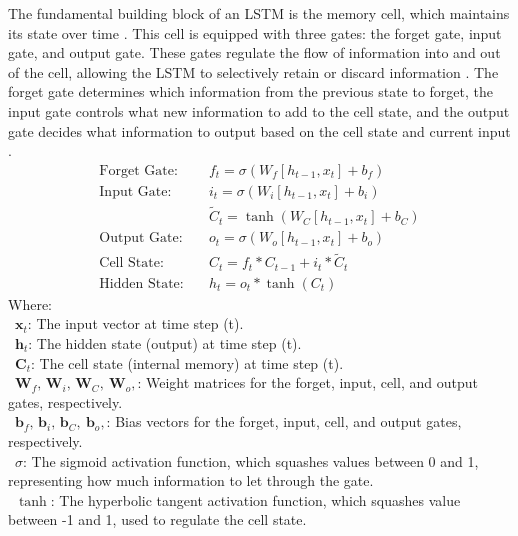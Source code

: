 \documentclass{ieeeojies}
\begin{document}
The fundamental building block of an LSTM is the memory cell, which maintains its state over time \cite{b18}. This cell is equipped with three gates: the forget gate, input gate, and output gate. These gates regulate the flow of information into and out of the cell, allowing the LSTM to selectively retain or discard information \cite{b19}. The forget gate determines which information from the previous state to forget, the input gate controls what new information to add to the cell state, and the output gate decides what information to output based on the cell state and current input \cite{b18}.
\begin{align*}
  \text{Forget Gate:} \quad & f_t = \sigma(W_f [h_{t-1}, x_t] + b_f) \\
  \text{Input Gate:} \quad & i_t = \sigma(W_i [h_{t-1}, x_t] + b_i) \\
  & \tilde{C}_t = \tanh(W_C [h_{t-1}, x_t] + b_C) \\
  \text{Output Gate:} \quad & o_t = \sigma(W_o [h_{t-1}, x_t] + b_o) \\
  \text{Cell State:} \quad & C_t = f_t * C_{t-1} + i_t * \tilde{C}_t \\
  \text{Hidden State:} \quad & h_t = o_t * \tanh(C_t)
\end{align*} 
Where: \\
         \indent\textbullet\ \textbf{\(\mathbf{x}_t\)}: The input vector at time step (t). \\
         \indent\textbullet\ \textbf{\(\mathbf{h}_t\)}: The hidden state (output) at time step (t). \\
         \indent\textbullet\ \textbf{\(\mathbf{C}_t\)}: The cell state (internal memory) at time step (t). \\
         \indent\textbullet\ \textbf{\(\mathbf{W}_f,\, \mathbf{W}_i,\, \mathbf{W}_C,\ \mathbf{W}_o,\)}: Weight matrices for the forget, input, cell, and output gates, respectively. \\ 
         \indent\textbullet\ \textbf{\(\mathbf{b}_f,\, \mathbf{b}_i,\, \mathbf{b}_C,\ \mathbf{b}_o,\)}: Bias vectors for the forget, input, cell, and output gates, respectively. \\
         \indent\textbullet\ \(\sigma\): The sigmoid activation function, which squashes values between 0 and 1, representing how much information to let through the gate. \\ 
         \indent\textbullet\ \(\tanh\): The hyperbolic tangent activation function, which squashes value between -1 and 1, used to regulate the cell state. \\ \\
\end{document}
